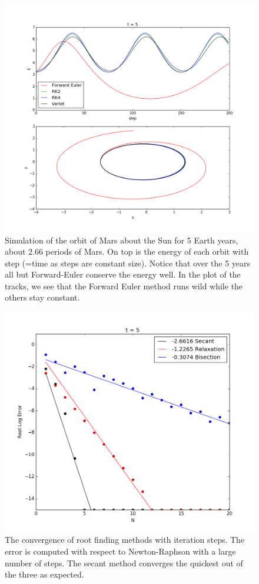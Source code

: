 \documentclass{article}
\begin{document}
\begin{figure}[h]
    \includegraphics[width=\textwidth]{MarsOrbit.png}
    \caption{Simulation of the orbit of Mars about the Sun for 5 Earth years, about 2.66 periods of Mars. On top is the energy of each orbit with step (=time as steps are constant size). Notice that over the 5 years all but Forward-Euler conserve the energy well. In the plot of the tracks, we see that the Forward Euler method runs wild while the others stay constant.  }
    \label{fig:marsex}
\end{figure}

\begin{figure}[h]
    \includegraphics[width=\textwidth]{rootconv.png}
    \caption{The convergence of root finding methods with iteration steps. The error is computed with respect to Newton-Raphson with a large number of steps. The secant method converges the quickest out of the three as expected.}
    \label{fig:rootconv}
\end{figure}
\end{document}
